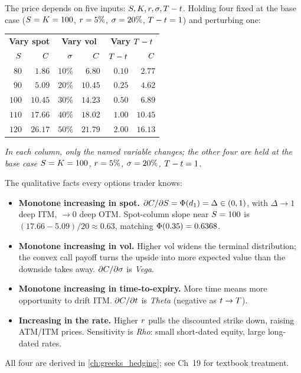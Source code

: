The price depends on five inputs: $S, K, r, \sigma,
T - t$. Holding four fixed at the base case ($S =
K = 100$, $r = 5\%$, $\sigma = 20\%$, $T - t = 1$)
and perturbing one:

\begin{center}
\begin{tabular}{@{}rr@{\quad}rr@{\quad}rr@{}}
\toprule
\multicolumn{2}{c}{\textbf{Vary spot}}
& \multicolumn{2}{c}{\textbf{Vary vol}}
& \multicolumn{2}{c}{\textbf{Vary $T - t$}} \\
$S$ & $C$ & $\sigma$ & $C$ & $T - t$ & $C$ \\
\midrule
$80$  & $1.86$  & $10\%$ & $6.80$  & $0.10$ & $2.77$  \\
$90$  & $5.09$  & $20\%$ & $10.45$ & $0.25$ & $4.62$  \\
$100$ & $10.45$ & $30\%$ & $14.23$ & $0.50$ & $6.89$  \\
$110$ & $17.66$ & $40\%$ & $18.02$ & $1.00$ & $10.45$ \\
$120$ & $26.17$ & $50\%$ & $21.79$ & $2.00$ & $16.13$ \\
\bottomrule
\end{tabular}
\end{center}
\noindent\emph{In each column, only the named variable changes;
the other four are held at the base case $S = K =
100$, $r = 5\%$, $\sigma = 20\%$, $T - t = 1$.}

The qualitative facts every options trader knows:
\begin{itemize}
  \item \textbf{Monotone increasing in spot.}
  $\partial C/\partial S = \Phi(d_1) = \Delta \in (0, 1)$,
  with $\Delta \to 1$ deep ITM, $\to 0$ deep OTM. Spot-column
  slope near $S = 100$ is $(17.66-5.09)/20 \approx 0.63$,
  matching $\Phi(0.35) = 0.6368$.
  \item \textbf{Monotone increasing in vol.} Higher vol widens
  the terminal distribution; the convex call payoff turns the
  upside into more expected value than the downside takes away.
  $\partial C/\partial\sigma$ is \emph{Vega}.
  \item \textbf{Monotone increasing in time-to-expiry.} More
  time means more opportunity to drift ITM. $\partial C/
  \partial t$ is \emph{Theta} (negative as $t \to T$).
  \item \textbf{Increasing in the rate.} Higher $r$ pulls
  the discounted strike down, raising ATM/ITM prices.
  Sensitivity is \emph{Rho}: small short-dated equity, large
  long-dated rates.
\end{itemize}
All four are derived in \cref{ch:greeks_hedging}; see
\citeHull{} Ch~19 for textbook treatment.

